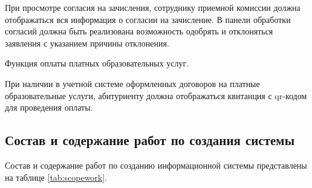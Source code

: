 При просмотре согласия на зачисления, сотруднику приемной комиссии должна отображаться вся информация о согласии на зачисление. В панели обработки согласий должна быть реализована возможность одобрять и отклоняться заявления с указанием причины отклонения.

Функция оплаты платных образовательных услуг.

При наличии в учетной системе оформленных договоров на платные образовательные услуги, абитуриенту должна отображаться квитанция с qr-кодом для проведения оплаты.

\subsection{Состав и содержание работ по создания системы}

Состав и содержание работ по созданию информационной системы представлены на таблице \ref{tab:scopework}.
